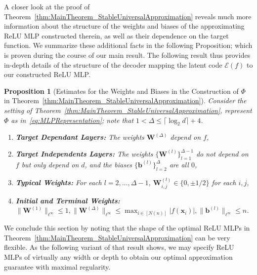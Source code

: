 \documentclass{article}
\numberwithin{equation}{section}
\newtheorem{proposition}{Proposition}[section]
\theoremstyle{definition}
\begin{document}
A closer look at the proof of Theorem~\ref{thm:MainTheorem_StableUniversalApproximation} reveals much more information about the structure of the weights and biases of the approximating ReLU MLP constructed therein, as well as their dependence on the target function.  We summarize these additional facts in the following Proposition; which is proven during the course of our main result.   The following result thus provides in-depth details of the structure of the decoder mapping the latent code $\mathcal{E}(f)$ to our constructed ReLU MLP.
\begin{proposition}[{Estimates for the Weights and Biases in the Construction of $\Phi$ in Theorem~\ref{thm:MainTheorem_StableUniversalApproximation}}]
\label{proposition:ParamterEstimates__RefinedVersion}
Consider the setting of Theorem~\ref{thm:MainTheorem_StableUniversalApproximation}, represent $\Phi$ as in~\eqref{eq:MLPRepresentation}; note that $1<\Delta\le \lceil \log_2{d} \rceil + 4$.
\begin{enumerate}
    \item[(i)] \textbf{Target Dependant Layers:} The weights $\mathbf{W}^{(\Delta)}$ depend on $f$,
    \item[(ii)] \textbf{Target Independents Layers:} The weights $\{\mathbf{W}^{(l)}\}_{l=1}^{\Delta-1}$ do not depend on $f$ but only depend on $d$, and the biases $\{\mathbf{b}^{(l)}\}_{l=2}^{\Delta}$ are all $0$,
    \item[(iii)] \textbf{Typical Weights:} For each $l=2,\dots,\Delta-1$, $\mathbf{W}^{(l)}_{i,j} \in \{0,\pm 1/2\}$ for each $i,j$,
    \item[(iv)] \textbf{Initial and Terminal Weights:} $\displaystyle
    \|\mathbf{W}^{(1)}\|_{\ell^{\infty}} \le 1, 
    \|\mathbf{W}^{(\Delta)}\|_{\ell^{\infty}} \le \max_{i\in [N(n)]} |f(\mathbf{x}_i)|, 
    \|\mathbf{b}^{(l)}\|_{\ell^{\infty}} \le n$.
\end{enumerate}
\end{proposition}


We conclude this section by noting that the shape of the optimal ReLU MLPs in Theorem~\ref{thm:MainTheorem_StableUniversalApproximation}
can be very flexible.  As the following variant of that result shows, we may specify ReLU MLPs of virtually any width or depth to obtain our optimal approximation guarantee with maximal regularity. 
\end{document}
